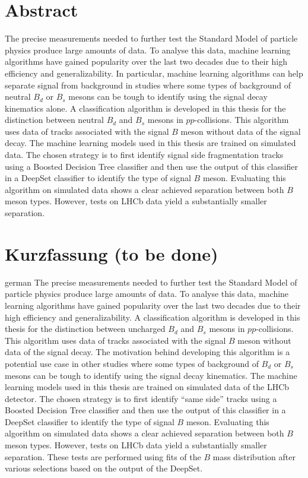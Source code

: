 \thispagestyle{plain}

\section*{Abstract} %
The precise measurements needed to further test the Standard Model of particle physics produce large amounts of data.
To analyse this data, machine learning algorithms have gained popularity over the last two decades due to their high efficiency and generalizability.
In particular, machine learning algorithms can help separate signal from background in studies where some types of background of neutral $B_d$ or $B_s$ mesons can be tough to identify using the signal decay kinematics alone.
A classification algorithm is developed in this thesis for the distinction between neutral $B_d$ and $B_s$ mesons in $pp$-collisions.
This algorithm uses data of tracks associated with the signal $B$ meson without data of the signal decay. 
The machine learning models used in this thesis are trained on simulated data. 
The chosen strategy is to first identify signal side fragmentation tracks using a Boosted Decision Tree classifier and then use the output of this classifier in a DeepSet classifier to identify the type of signal $B$ meson.
Evaluating this algorithm on simulated data shows a clear achieved separation between both $B$ meson types.
However, tests on LHCb data yield a substantially smaller separation.

\section*{Kurzfassung (to be done)} %
\begin{foreignlanguage}{german}
    The precise measurements needed to further test the Standard Model of particle physics produce large amounts of data.
    To analyse this data, machine learning algorithms have gained popularity over the last two decades due to their high efficiency and generalizability.
    A classification algorithm is developed in this thesis for the distinction between uncharged $B_d$ and $B_s$ mesons in $pp$-collisions.
    This algorithm uses data of tracks associated with the signal $B$ meson without data of the signal decay. 
    The motivation behind developing this algorithm is a potential use case in other studies where some types of background of $B_d$ or $B_s$ mesons can be tough to identify using the signal decay kinematics.
    The machine learning models used in this thesis are trained on simulated data of the LHCb detector. %
    The chosen strategy is to first identify \enquote{same side} tracks using a Boosted Decision Tree classifier and then use the output of this classifier in a DeepSet classifier to identify the type of signal $B$ meson.
    Evaluating this algorithm on simulated data shows a clear achieved separation between both $B$ meson types.
    However, tests on LHCb data yield a substantially smaller separation.
    These tests are performed using fits of the $B$ mass distribution after various selections based on the output of the DeepSet.
\end{foreignlanguage}
